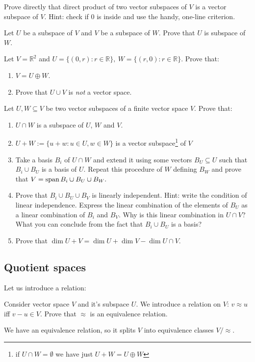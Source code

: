 \begin{prob}
  Prove directly that direct product of two vector subspaces of $V$ is a vector subspace of $V$. Hint: check if 0 is inside and use the handy, one-line criterion.
\end{prob}

\begin{prob}
  Let $U$ be a subspace of $V$ and $V$ be a subspace of $W$. Prove that $U$ is subspace of $W$.
\end{prob}

\begin{prob}
  Let $V=\mathbb R^2$ and $U=\{(0, r) : r\in \mathbb R\},~W=\{(r, 0) : r\in \mathbb R\}$. Prove that:
  \begin{enumerate}
    \item $V=U\oplus W$.
    \item Prove that $U\cup V$ is \textit{not} a vector space.
  \end{enumerate}
\end{prob}

\begin{prob}
  Let $U,W\subseteq V$ be two vector subspaces of a finite vector space $V$. Prove that:
  \begin{enumerate}
    \item $U\cap W$ is a subspace of $U$, $W$ and $V$.
    \item $U+W:=\{u+w : u\in U, w\in W\}$ is a vector subspace\footnote{if $U\cap W=\emptyset$ we have just $U+W=U\oplus W$} of $V$
    \item Take a basis $B_i$ of $U\cap W$ and extend it using some vectors $B_U\subseteq U$ such that $B_i\cup B_U$ is a basis of $U$.
      Repeat this procedure of $W$ defining $B_W$ and prove that $V=\text{span\,} B_i\cup B_U\cup B_W.$
    \item Prove that $B_i\cup B_U\cup B_V$ is linearly independent. Hint: write the condition of linear independence. Express the linear combination of the elements of $B_U$ as a linear combination of $B_i$ and $B_V$. Why is this linear combination in $U\cap V$? What you can conclude from the fact that $B_i\cup B_U$ is a basis?
    \item Prove that $\dim U+V=\dim U+\dim V - \dim U\cap V$.
  \end{enumerate}
\end{prob}

\subsection{Quotient spaces}
Let us introduce a relation:
\begin{prob}
  Consider vector space $V$ and it's subspace $U$. We introduce a relation on $V$: $v\approx u$ iff $v-u\in V$. Prove that $\approx$ is an equivalence relation.
\end{prob}
We have an equivalence relation, so it splits $V$ into equivalence classes $V/\approx$.

